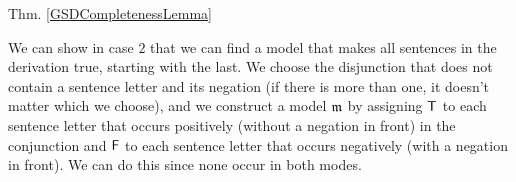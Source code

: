 \begin{PROOFOF}{Thm. \ref{GSDCompletenessLemma}}
\begin{gproofnn}
\glinend{ }{ }{ }
\glinend{ }{$\qquad\vdots$}{ }
\glinend{ }{ }{ }
\glinend{ }{ }{ }
\glinend{ }{$\qquad\vdots$}{ }
\glinend{ }{ }{ }
\glinend{ }{ }{ }
\glinend{ }{$\qquad\vdots$}{ }
\glinend{ }{ }{ }
\end{gproofnn}
We can show in case $2$ that we can find a model that makes all sentences in the derivation true, starting with the last. 
We choose the disjunction that does not contain a sentence letter and its negation (if there is more than one, it doesn't matter which we choose), and we construct a model $\mathfrak{m}$ by assigning $\mathsf{T}$ to each sentence letter that occurs positively (without a negation in front) in the conjunction and $\mathsf{F}$ to each sentence letter that occurs negatively (with a negation in front).
We can do this since none occur in both modes. 


\end{PROOFOF}
